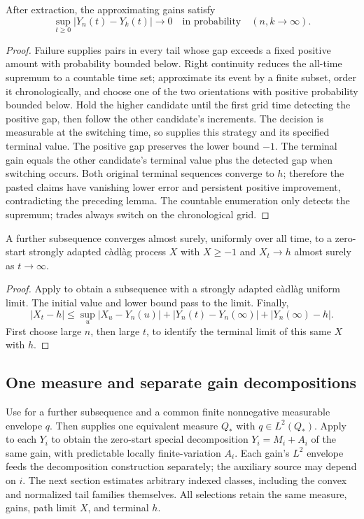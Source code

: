 \begin{proposition}\label{prop:all-time-cauchy}
After extraction, the approximating gains satisfy
\[
 \sup_{t\geq0}|Y_n(t)-Y_k(t)|\longrightarrow0
 \quad\text{in probability}\quad(n,k\longrightarrow\infty).
\]
\end{proposition}
\begin{proof}
Failure supplies pairs in every tail whose gap exceeds a fixed positive
amount with probability bounded below. Right continuity reduces the all-time
supremum to a countable time set; approximate its event by a finite subset,
order it chronologically, and choose one of the two orientations with
positive probability bounded below. Hold the higher candidate until the first
grid time detecting the positive gap, then follow the other candidate's
increments. The decision is measurable at the switching time, so 
supplies this strategy and its specified terminal value. The positive gap preserves the lower bound $-1$.
The terminal gain equals the other candidate's terminal value plus the detected
gap when switching occurs. Both original terminal sequences converge to $h$;
therefore the pasted claims have vanishing lower error and persistent positive
improvement, contradicting the preceding lemma. The countable enumeration
only detects the supremum; trades always switch on the chronological grid.
\end{proof}
\begin{proposition}
A further subsequence converges almost surely, uniformly over all time, to a
zero-start strongly adapted c\`adl\`ag process $X$ with $X\geq-1$ and
$X_t\to h$ almost surely as $t\to\infty$.
\end{proposition}
\begin{proof}
Apply  to obtain a subsequence with a strongly adapted c\`adl\`ag uniform limit.
The initial value and lower bound pass to the limit.
Finally,
\[
 |X_t-h|\leq\sup_u|X_u-Y_n(u)|+
 |Y_n(t)-Y_n(\infty)|+|Y_n(\infty)-h|.
\]
First choose large $n$, then large $t$, to identify the terminal limit of
this same $X$ with $h$.
\end{proof}

\subsection{One measure and separate gain decompositions}
Use  for a further subsequence and a common finite nonnegative measurable envelope $q$.
Then  supplies one equivalent measure $Q_*$ with $q\in L^2(Q_*)$.
Apply  to each $Y_i$ to obtain the zero-start special decomposition
$Y_i=M_i+A_i$ of the same gain, with predictable locally finite-variation $A_i$.
Each gain's $L^2$ envelope feeds the decomposition construction separately;
the auxiliary source may depend on $i$. The next section estimates arbitrary
indexed classes, including the convex and normalized tail families themselves.
All selections retain the same measure, gains, path limit $X$, and terminal $h$.
